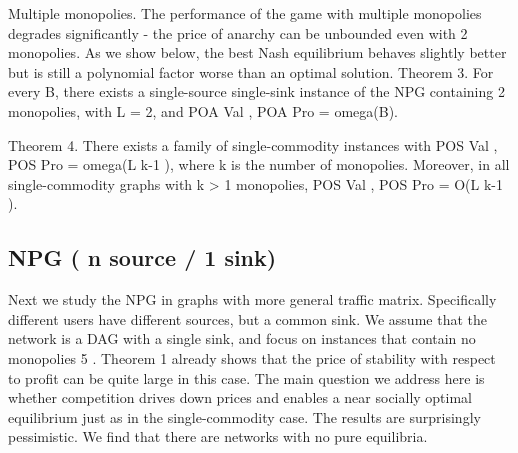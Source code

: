 \documentclass{beamer}
\begin{document}
\begin{frame}
Multiple monopolies. The performance of the game with multiple monopolies
degrades significantly - the price of anarchy can be unbounded even with 2
monopolies. As we show below, the best Nash equilibrium behaves slightly better
but is still a polynomial factor worse than an optimal solution.
Theorem 3. For every B, there exists a single-source single-sink instance of
the NPG containing 2 monopolies, with L = 2, and POA Val , POA Pro = omega(B).


Theorem 4. There exists a family of single-commodity instances with POS Val ,
POS Pro = omega(L k-1 ), where k is the number of monopolies. Moreover, in all
single-commodity graphs with k > 1 monopolies, POS Val , POS Pro = O(L k-1 ).
\end{frame}


\subsection{NPG ( n source / 1 sink)}


\begin{frame}
Next we study the NPG in graphs with more general traffic matrix. Specifically
different users have different sources, but a common sink. We assume that the
network is a DAG with a single sink, and focus on instances that contain no
monopolies 5 . Theorem 1 already shows that the price of stability with respect
to profit can be quite large in this case. The main question we address here
is whether competition drives down prices and enables a near socially optimal
equilibrium just as in the single-commodity case.
The results are surprisingly pessimistic. We find that there are networks with
no pure equilibria.
\end{frame}
\end{document}
